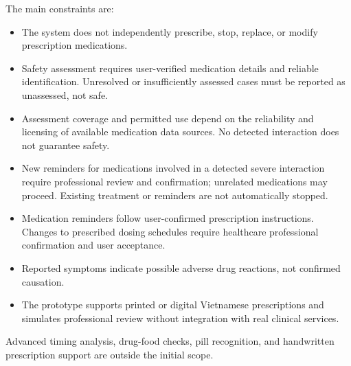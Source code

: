 The main constraints are:

\begin{itemize}
    \item The system does not independently prescribe, stop, replace, or modify prescription medications.

    \item Safety assessment requires user-verified medication details and reliable identification. Unresolved or insufficiently assessed cases must be reported as unassessed, not safe.

    \item Assessment coverage and permitted use depend on the reliability and licensing of available medication data sources. No detected interaction does not guarantee safety.

    \item New reminders for medications involved in a detected severe interaction require professional review and confirmation; unrelated medications may proceed. Existing treatment or reminders are not automatically stopped.
    
    \item Medication reminders follow user-confirmed prescription instructions. Changes to prescribed dosing schedules require healthcare professional confirmation and user acceptance.

    \item Reported symptoms indicate possible adverse drug reactions, not confirmed causation.

    \item The prototype supports printed or digital Vietnamese prescriptions and simulates professional review without integration with real clinical services.
\end{itemize}

Advanced timing analysis, drug-food checks, pill recognition, and handwritten prescription support are outside the initial scope.
